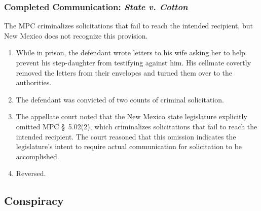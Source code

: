 \subsubsection{Completed Communication: \emph{State v. Cotton}}

The MPC criminalizes solicitations that fail to reach the intended recipient, 
but New Mexico does not recognize this provision.

\begin{enumerate}
    \item While in prison, the defendant wrote letters to his wife asking her 
    to help prevent his step-daughter from testifying against him. His 
    cellmate covertly removed the letters from their envelopes and turned them 
    over to the authorities.
    \item The defendant was convicted of two counts of criminal solicitation.
    \item The appellate court noted that the New Mexico state legislature 
    explicitly omitted MPC \S\ 5.02(2), which criminalizes solicitations that 
    fail to reach the intended recipient. The court reasoned that this 
    omission indicates the legislature's intent to require actual 
    communication for solicitation to be accomplished.
    \item Reversed.
\end{enumerate}

\subsection{Conspiracy}

